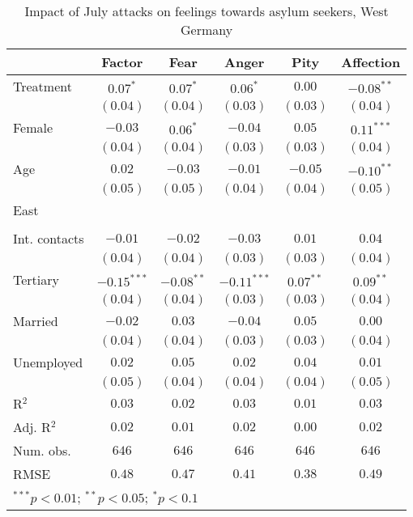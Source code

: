 
\begin{table}
\caption{Impact of July attacks on feelings towards asylum seekers, West Germany}
\begin{center}
\begin{tabular}{l c c c c c}
\toprule
 & Factor & Fear & Anger & Pity & Affection \\
\midrule
Treatment     & $0.07^{*}$    & $0.07^{*}$   & $0.06^{*}$    & $0.00$      & $-0.08^{**}$ \\
              & $(0.04)$      & $(0.04)$     & $(0.03)$      & $(0.03)$    & $(0.04)$     \\
Female        & $-0.03$       & $0.06^{*}$   & $-0.04$       & $0.05$      & $0.11^{***}$ \\
              & $(0.04)$      & $(0.04)$     & $(0.03)$      & $(0.03)$    & $(0.04)$     \\
Age           & $0.02$        & $-0.03$      & $-0.01$       & $-0.05$     & $-0.10^{**}$ \\
              & $(0.05)$      & $(0.05)$     & $(0.04)$      & $(0.04)$    & $(0.05)$     \\
East          &               &              &               &             &              \\
              &               &              &               &             &              \\
Int. contacts & $-0.01$       & $-0.02$      & $-0.03$       & $0.01$      & $0.04$       \\
              & $(0.04)$      & $(0.04)$     & $(0.03)$      & $(0.03)$    & $(0.04)$     \\
Tertiary      & $-0.15^{***}$ & $-0.08^{**}$ & $-0.11^{***}$ & $0.07^{**}$ & $0.09^{**}$  \\
              & $(0.04)$      & $(0.04)$     & $(0.03)$      & $(0.03)$    & $(0.04)$     \\
Married       & $-0.02$       & $0.03$       & $-0.04$       & $0.05$      & $0.00$       \\
              & $(0.04)$      & $(0.04)$     & $(0.03)$      & $(0.03)$    & $(0.04)$     \\
Unemployed    & $0.02$        & $0.05$       & $0.02$        & $0.04$      & $0.01$       \\
              & $(0.05)$      & $(0.04)$     & $(0.04)$      & $(0.04)$    & $(0.05)$     \\
\midrule
R$^2$         & $0.03$        & $0.02$       & $0.03$        & $0.01$      & $0.03$       \\
Adj. R$^2$    & $0.02$        & $0.01$       & $0.02$        & $0.00$      & $0.02$       \\
Num. obs.     & $646$         & $646$        & $646$         & $646$       & $646$        \\
RMSE          & $0.48$        & $0.47$       & $0.41$        & $0.38$      & $0.49$       \\
\bottomrule
\multicolumn{6}{l}{\scriptsize{$^{***}p<0.01$; $^{**}p<0.05$; $^{*}p<0.1$}}
\end{tabular}
\label{tab_emo_west}
\end{center}
\end{table}
